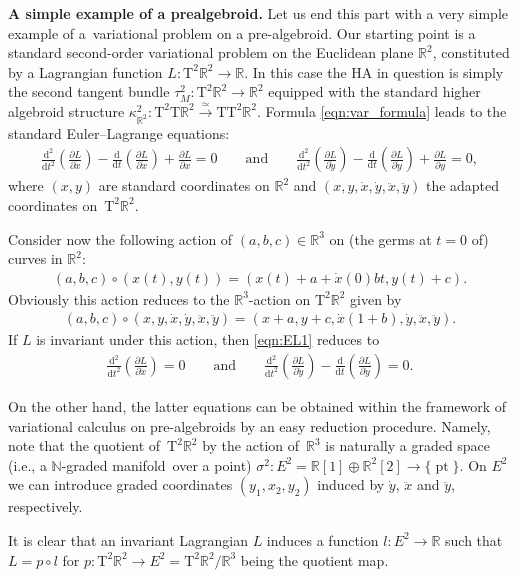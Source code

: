 \documentclass[10pt,a4paper]{amsart}
\newcommand{\grB}{{$\N$-graded manifold}}
\newcommand{\R}{\mathbb{R}}
\newcommand{\N}{\mathbb{N}}
\newcommand{\pa}{\partial}
\newcommand{\pt}{\operatorname{pt}}
\newcommand{\lra}{\longrightarrow}
\newcommand{\ra}{\rightarrow}
\newcommand{\prealg}{pre-algebroid} %
\newcommand{\T}{\mathrm{T}} %
\newcommand{\TT}[1]{\mathrm{T}^{#1}} %
\newcommand{\dbydt}{\frac{\mathrm{d}}{\mathrm{d}t}}
\newcommand{\dbydtk}[1]{\frac{\mathrm{d}^{#1}}{\mathrm{d}t^{#1}}}
\numberwithin{equation}{section}
\theoremstyle{definition}
\begin{document}
{\bf A simple example of a prealgebroid.} Let us end this part with a very simple example of a~variational problem on a \prealg . Our starting point is a standard second-order variational problem on the Euclidean plane $\R^2$, constituted by a Lagrangian function \mbox{$L\colon \TT{2}\R^2\ra \R$}. In this case the HA in question is simply the second tangent bundle $\tau^2_M\colon \TT{2} \R^2\ra \R^2$ equipped with the standard higher algebroid structure $\kappa^2_{\R^2}\colon \TT{2}\T\R^2\overset{\simeq}{\lra}\T\TT{2}\R^2$. Formula \eqref{eqn:var_formula} leads to the standard Euler--Lagrange equations:
\begin{gather}\label{eqn:EL1}
\dbydtk{2}\left(\frac{\pa L}{\pa \ddot x}\right)-\dbydt \left(\frac{\pa L}{\pa \dot x}\right)+\frac{\pa L}{\pa x}=0\qquad\text{and}\qquad \dbydtk{2}\left(\frac{\pa L}{\pa \ddot y}\right)-\dbydt \left(\frac{\pa L}{\pa \dot y}\right)+\frac{\pa L}{\pa y}=0,
\end{gather}
where $(x,y)$ are standard coordinates on $\R^2$ and $(x,y,\dot x,\dot y,\ddot x,\ddot y)$ the adapted coordinates on~$\TT{2}\R^2$.

Consider now the following action of $(a,b,c)\in \R^3$ on (the germs at $t=0$ of) curves in $\R^2$:
\begin{gather*}(a,b,c)\circ (x(t),y(t))=(x(t)+a+\dot x(0)bt, y(t)+c).\end{gather*}
Obviously this action reduces to the $\R^3$-action on $\TT{2}\R^2$ given by
\begin{gather*}(a,b,c)\circ (x,y,\dot x,\dot y,\ddot x,\ddot y)=(x+a,y+c,\dot x(1+b),\dot y,\ddot x,\ddot y).\end{gather*}
If $L$ is invariant under this action, then \eqref{eqn:EL1} reduces to
\begin{gather}\label{eqn:EL2}
\dbydtk{2}\left(\frac{\pa L}{\pa \ddot x}\right)=0\qquad\text{and}\qquad \dbydtk{2}\left(\frac{\pa L}{\pa \ddot y}\right)-\dbydt \left(\frac{\pa L}{\pa \dot y}\right)=0.
\end{gather}

On the other hand, the latter equations can be obtained within the framework of variational calculus on \prealg s by an easy reduction procedure. Namely, note that the quotient of~$\TT{2}\R^2$ by the action of~$\R^3$ is naturally a graded space (i.e., a \grB\ over a point) $\sigma^2\colon E^2=\R[1]\oplus\R^2[2]\ra\{\pt\}$. On $E^2$ we can introduce graded coordinates $(y_1,x_2,y_2)$ induced by $\dot y$, $\ddot x$ and $\ddot y$, respectively.

It is clear that an invariant Lagrangian $L$ induces a function $l\colon E^2\ra\R$ such that $L=p\circ l$ for $p\colon \TT{2}\R^2\ra E^2=\TT{2}\R^2/\R^3$ being the quotient map.
\end{document}
